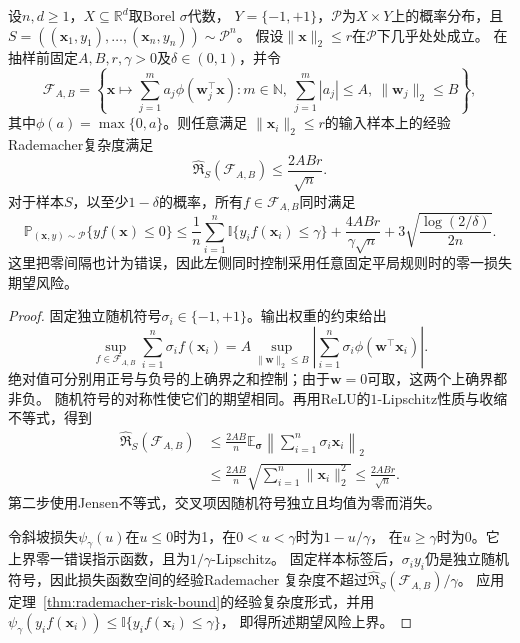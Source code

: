 \begin{theorem}[两层网络的范数与期望风险]
\label{thm:two-layer-norm-risk}
设$n,d\geq1$，$X\subseteq\mathbb R^d$取Borel $\sigma$代数，
$Y=\{-1,+1\}$，$\mathcal P$为$X\times Y$上的概率分布，且
$S=((\bm x_1,y_1),\ldots,(\bm x_n,y_n))\sim\mathcal P^n$。
假设$\|\bm x\|_2\leq r$在$\mathcal P$下几乎处处成立。
在抽样前固定$A,B,r,\gamma>0$及$\delta\in(0,1)$，并令
\[
 \mathcal F_{A,B}=\left\{\bm x\mapsto\sum_{j=1}^m a_j\phi(\bm w_j^\top\bm x):
 m\in\mathbb N,\ \sum_{j=1}^m|a_j|\leq A,\ \|\bm w_j\|_2\leq B\right\},
\]
其中$\phi(a)=\max\{0,a\}$。则任意满足
$\|\bm x_i\|_2\leq r$的输入样本上的经验Rademacher复杂度满足
\[
 \widehat{\mathfrak R}_S(\mathcal F_{A,B})\leq\frac{2ABr}{\sqrt n}.
\]
对于样本$S$，以至少$1-\delta$的概率，所有$f\in\mathcal F_{A,B}$同时满足
\begin{equation}
 \mathbb P_{(\bm x,y)\sim\mathcal P}\{yf(\bm x)\leq0\}
 \leq\frac1n\sum_{i=1}^n\mathbb I\{y_i f(\bm x_i)\leq\gamma\}
 +\frac{4ABr}{\gamma\sqrt n}
 +3\sqrt{\frac{\log(2/\delta)}{2n}}.
 \label{eq:two-layer-margin-bound}
\end{equation}
这里把零间隔也计为错误，因此左侧同时控制采用任意固定平局规则时的零一损失期望风险。
\end{theorem}
\begin{proof}
固定独立随机符号$\sigma_i\in\{-1,+1\}$。输出权重的约束给出
\[
 \sup_{f\in\mathcal F_{A,B}}\sum_{i=1}^n\sigma_i f(\bm x_i)
 =A\sup_{\|\bm w\|_2\leq B}
 \left|\sum_{i=1}^n\sigma_i\phi(\bm w^\top\bm x_i)\right|.
\]
绝对值可分别用正号与负号的上确界之和控制；由于$\bm w=0$可取，这两个上确界都非负。
随机符号的对称性使它们的期望相同。再用ReLU的$1$-Lipschitz性质与收缩不等式，得到
\[
 \begin{aligned}
 \widehat{\mathfrak R}_S(\mathcal F_{A,B})
 &\leq\frac{2AB}{n}\mathbb E_{\bm\sigma}
       \left\|\sum_{i=1}^n\sigma_i\bm x_i\right\|_2\\
 &\leq\frac{2AB}{n}\sqrt{\sum_{i=1}^n\|\bm x_i\|_2^2}
 \leq\frac{2ABr}{\sqrt n}.
 \end{aligned}
\]
第二步使用Jensen不等式，交叉项因随机符号独立且均值为零而消失。

令斜坡损失$\psi_\gamma(u)$在$u\leq0$时为1，在$0<u<\gamma$时为$1-u/\gamma$，
在$u\geq\gamma$时为0。它上界零一错误指示函数，且为$1/\gamma$-Lipschitz。
固定样本标签后，$\sigma_i y_i$仍是独立随机符号，因此损失函数空间的经验Rademacher
复杂度不超过$\widehat{\mathfrak R}_S(\mathcal F_{A,B})/\gamma$。
应用定理~\ref{thm:rademacher-risk-bound}的经验复杂度形式，并用
$\psi_\gamma(y_i f(\bm x_i))\leq\mathbb I\{y_i f(\bm x_i)\leq\gamma\}$，
即得所述期望风险上界。
\end{proof}


